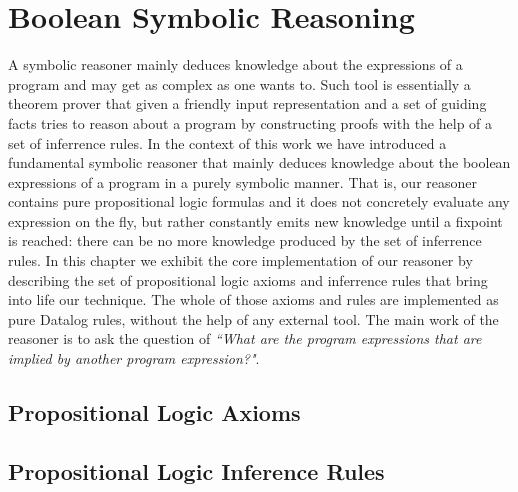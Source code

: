 \section{Boolean Symbolic Reasoning}

A symbolic reasoner mainly deduces knowledge about the expressions of a program and may get
as complex as one wants to. Such tool is essentially a theorem prover that given a
friendly input representation and a set of guiding facts tries to reason about a program
by constructing proofs with the help of a set of inferrence rules. In the context of this
work we have introduced a fundamental symbolic reasoner that mainly deduces knowledge about the
boolean expressions of a program in a purely symbolic manner. That is, our reasoner
contains pure propositional logic formulas and it
does not concretely evaluate any expression on the fly, but rather constantly emits
new knowledge until a fixpoint is reached: there can be no more knowledge produced by
the set of inferrence rules. In this chapter we exhibit the core implementation of our
reasoner by describing the set of propositional logic axioms and inferrence rules that
bring into life our technique. The whole of those axioms and rules are implemented as
pure Datalog rules, without the help of any external tool. The main work of the reasoner
is to ask the question of \emph{``What are the program expressions that are implied by another program expression?"}.

\subsection{Propositional Logic Axioms}

\subsection{Propositional Logic Inference Rules}
